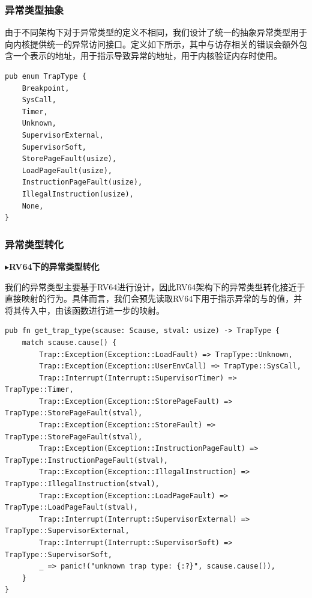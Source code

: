 \documentclass{article}
\begin{document}
\subsubsection{异常类型抽象}

由于不同架构下对于异常类型的定义不相同，我们设计了统一的抽象异常类型用于向内核提供统一的异常访问接口。定义如下所示，其中与访存相关的错误会额外包含一个表示的地址，用于指示导致异常的地址，用于内核验证内存时使用。

\begin{lstlisting}
pub enum TrapType {
    Breakpoint,
    SysCall,
    Timer,
    Unknown,
    SupervisorExternal,
    SupervisorSoft,
    StorePageFault(usize),
    LoadPageFault(usize),
    InstructionPageFault(usize),
    IllegalInstruction(usize),
    None,
}
\end{lstlisting}

\subsubsection{异常类型转化}

$\blacktriangleright$\textbf{RV64下的异常类型转化}

我们的异常类型主要基于RV64进行设计，因此RV64架构下的异常类型转化接近于直接映射的行为。具体而言，我们会预先读取RV64下用于指示异常的与的值，并将其传入中，由该函数进行进一步的映射。

\begin{lstlisting}
pub fn get_trap_type(scause: Scause, stval: usize) -> TrapType {
    match scause.cause() {
        Trap::Exception(Exception::LoadFault) => TrapType::Unknown,
        Trap::Exception(Exception::UserEnvCall) => TrapType::SysCall,
        Trap::Interrupt(Interrupt::SupervisorTimer) => TrapType::Timer,
        Trap::Exception(Exception::StorePageFault) => TrapType::StorePageFault(stval),
        Trap::Exception(Exception::StoreFault) => TrapType::StorePageFault(stval),
        Trap::Exception(Exception::InstructionPageFault) => TrapType::InstructionPageFault(stval),
        Trap::Exception(Exception::IllegalInstruction) => TrapType::IllegalInstruction(stval),
        Trap::Exception(Exception::LoadPageFault) => TrapType::LoadPageFault(stval),
        Trap::Interrupt(Interrupt::SupervisorExternal) => TrapType::SupervisorExternal,
        Trap::Interrupt(Interrupt::SupervisorSoft) => TrapType::SupervisorSoft,
        _ => panic!("unknown trap type: {:?}", scause.cause()),
    }
}
\end{lstlisting}
\end{document}
